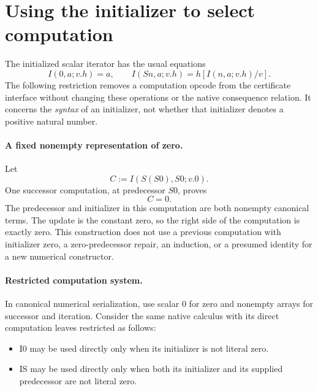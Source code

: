 
\section{Using the initializer to select computation}
\label{sec:seed-dispatch}

The initialized scalar iterator has the usual equations
\[
 I(0,a;v.h)=a,\qquad
 I(Sn,a;v.h)=h[I(n,a;v.h)/v].
 \tag{I0, IS}
\]
The following restriction removes a computation opcode from the
certificate interface without changing these operations or the native
consequence relation.  It concerns the \emph{syntax} of an initializer,
not whether that initializer denotes a positive natural number.

\paragraph{A fixed nonempty representation of zero.}
Let
\[
               C:=I(S(S0),S0;v.0).
 \tag{Auxiliary zero}\label{eq:dispatch-zero-term}
\]
One successor computation, at predecessor $S0$, proves
\[
                              C=0.\label{eq:dispatch-zero}
 \tag{Zero certificate}
\]
The predecessor and initializer in this computation are both nonempty
canonical terms.  The update is the constant zero, so the right side of
the computation is exactly zero.  This construction does not use a
previous computation with initializer zero, a zero-predecessor repair,
an induction, or a presumed identity for a new numerical constructor.

\paragraph{Restricted computation system.}
In canonical numerical serialization, use scalar $0$ for zero and
nonempty arrays for successor and iteration.  Consider the same native
calculus with its direct computation leaves restricted as follows:

\begin{itemize}
\item I0 may be used directly only when its initializer is not literal
  zero.
\item IS may be used directly only when both its initializer and its
  supplied predecessor are not literal zero.
\end{itemize}

